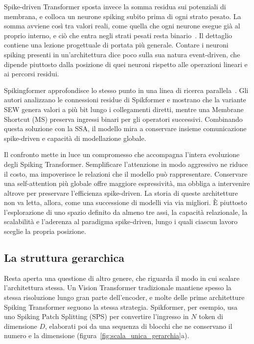 Spike-driven Transformer sposta invece la somma residua sui potenziali di membrana, e colloca un neurone spiking subito prima di ogni strato pesato. La somma avviene così tra valori reali, come quella che ogni neurone esegue già al proprio interno, e ciò che entra negli strati pesati resta binario~\cite{yao2023spikedriven}. Il dettaglio contiene una lezione progettuale di portata più generale. Contare i neuroni spiking presenti in un'architettura dice poco sulla sua natura event-driven, che dipende piuttosto dalla posizione di quei neuroni rispetto alle operazioni lineari e ai percorsi residui.

Spikingformer approfondisce lo stesso punto in una linea di ricerca parallela~\cite{zhou2026spikingformer}. Gli autori analizzano le connessioni residue di Spikformer e mostrano che la variante SEW genera valori a più bit lungo i collegamenti diretti, mentre una Membrane Shortcut (MS) preserva ingressi binari per gli operatori successivi. Combinando questa soluzione con la SSA, il modello mira a conservare insieme comunicazione spike-driven e capacità di modellazione globale.

Il confronto mette in luce un compromesso che accompagna l'intera evoluzione degli Spiking Transformer. Semplificare l'attenzione in modo aggressivo ne riduce il costo, ma impoverisce le relazioni che il modello può rappresentare. Conservare una self-attention più globale offre maggiore espressività, ma obbliga a intervenire altrove per preservare l'efficienza spike-driven. La storia di queste architetture non va letta, allora, come una successione di modelli via via migliori. È piuttosto l'esplorazione di uno spazio definito da almeno tre assi, la capacità relazionale, la scalabilità e l'aderenza al paradigma spike-driven, lungo i quali ciascun lavoro sceglie la propria posizione.

\subsection{La struttura gerarchica}
\label{subsec:struttura_gerarchica}

Resta aperta una questione di altro genere, che riguarda il modo in cui scalare l'architettura stessa. Un Vision Transformer tradizionale mantiene spesso la stessa risoluzione lungo gran parte dell'encoder, e molte delle prime architetture Spiking Transformer seguono la stessa strategia. Spikformer, per esempio, usa uno Spiking Patch Splitting (SPS) per convertire l'ingresso in $N$ token di dimensione $D$, elaborati poi da una sequenza di blocchi che ne conservano il numero e la dimensione (figura~\ref{fig:scala_unica_gerarchia}a).

